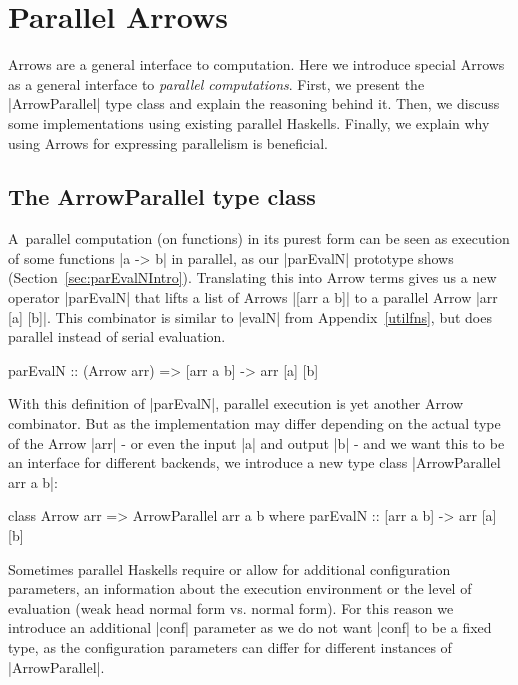 \section{Parallel Arrows}
\label{sec:parallel-arrows}
Arrows are a general interface to computation. Here we introduce special Arrows as a general interface to \textit{parallel computations}. First, we present the |ArrowParallel| type class and explain the reasoning behind it. Then, we discuss some implementations using existing parallel Haskells. Finally, we explain why using Arrows for expressing parallelism is beneficial.
\subsection{The ArrowParallel type class}
A~parallel computation (on functions) in its purest form can be seen as execution of some functions |a -> b| in parallel, as our |parEvalN| prototype shows (Section~\ref{sec:parEvalNIntro}).
Translating this into Arrow terms gives us a new operator |parEvalN| that lifts a list of Arrows |[arr a b]| to a parallel Arrow |arr [a] [b]|. %
This combinator is similar to |evalN| from Appendix~\ref{utilfns}, but does parallel instead of serial evaluation.
\begin{code}
parEvalN :: (Arrow arr) => [arr a b] -> arr [a] [b]
\end{code}
With this definition of |parEvalN|, parallel execution is yet another Arrow combinator. But as the implementation may differ depending on the actual type of the Arrow |arr| - or even the input |a| and output |b| - and we want this to be an interface for different backends, we introduce a new type class |ArrowParallel arr a b|: %
\begin{code}
class Arrow arr => ArrowParallel arr a b where
	parEvalN :: [arr a b] -> arr [a] [b]
\end{code}
Sometimes parallel Haskells require or allow for additional configuration parameters, \eg an information about the execution environment or the level of evaluation (weak head normal form vs. normal form). For this reason we introduce an additional |conf| parameter as we do not want |conf| to be a fixed type, as the configuration parameters can differ for different instances of |ArrowParallel|. %
